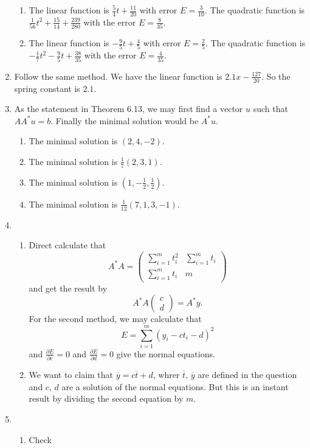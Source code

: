 \begin{enumerate}
\begin{enumerate}
\item The linear function is $\frac{5}{4}t+\frac{11}{20}$ with error $E=\frac{3}{10}$. The quadratic function is $\frac{1}{56}t^2+\frac{15}{14}+\frac{239}{280}$ with the error $E=\frac{8}{35}$.
\item The linear function is $-\frac{9}{5}t+\frac{4}{5}$ with error $E=\frac{2}{5}$. The quadratic function is $-\frac{1}{7}t^2-\frac{9}{5}t+\frac{38}{35}$ with the error $E=\frac{4}{35}$.
\end{enumerate}
\item Follow the same method. We have the linear function is $2.1x-\frac{127}{20}$. So the spring constant is $2.1$.
\item As the statement in Theorem 6.13, we may first find a vector $u$ such that $AA^*u=b$. Finally the minimal solution would be $A^*u$.
\begin{enumerate}
\item The minimal solution is $(2,4,-2)$.
\item The minimal solution is $\frac{1}{7}(2,3,1)$.
\item The minimal solution is $(1,-\frac{1}{2},\frac{1}{2})$.
\item The minimal solution is $\frac{1}{12}(7,1,3,-1)$.
\end{enumerate}
\item \begin{enumerate}
\item Direct calculate that 
\[A^*A=\begin{pmatrix}\sum_{i=1}^m{t_i^2} &\sum_{i=1}^m{t_i}\\\sum_{i=1}^m{t_i} & m\end{pmatrix}\]
and get the result by 
\[A^*A\begin{pmatrix}c\\d\end{pmatrix}=A^*y.\]
For the second method, we may calculate that 
\[E=\sum_{i=1}^m{(y_i-ct_i-d)^2}\]
and $\frac{\partial E}{\partial c}=0$ and $\frac{\partial E}{\partial d}=0$ give the normal equations.
\item We want to claim that $\overline{y}=c\overline{t}+d$, whrer $\overline{t}$, $\overline{y}$ are defined in the question and $c$, $d$ are a solution of the normal equations. But this is an instant result by dividing the second equation by $m$.
\end{enumerate}
\item \begin{enumerate}
\item Check 

\end{enumerate}
\end{enumerate}
